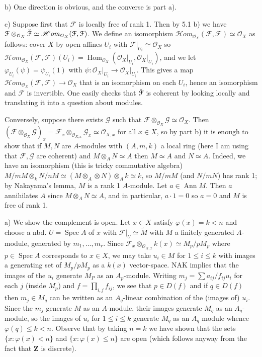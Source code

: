 \documentclass{report}
\newcommand{\F}{\mathcal{F}}
\renewcommand{\O}{\mathcal{O}}
\newcommand{\G}{\mathcal{G}}
\newcommand{\Z}{\mathbf{Z}}
\newcommand{\HOM}{\mathscr{H}\mathit{om}}
\DeclareMathOperator{\Hom}{Hom}
\DeclareMathOperator{\Spec}{Spec}
\DeclareMathOperator{\Ann}{Ann}
\begin{document}
\noindent
b)	One direction is obvious, and the converse is part a).

\noindent
c)	Suppose first that $\F$ is locally free of rank 1.  Then by 5.1 b) we have $\F\otimes_{\O_X}\Check{\F}\simeq \HOM_{\O_X}(\F,\F)$.
We define an isomorphism $\HOM_{\O_X}(\F,\F)\simeq \O_X$ as follows: cover $X$ by open affines $U_i$ with
$\F\big|_{U_i}\simeq \O_X$ so $\HOM_{\O_X}(\F,\F)(U_i)=\Hom_{\O_X}(\O_X\big|_{U_i},\O_X\big|_{U_i})$, and we let
$\varphi_{U_i}(\psi)=\psi_{U_i}(1)$ with $\psi:\O_X\big|_{U_i}\rightarrow \O_X\big|_{U_i}$.  This gives a map 
$\HOM_{\O_X}(\F,\F)\rightarrow \O_X$ that is an isomorphism on each $U_i$, hence an isomorphism and $\F$
is invertible.	One easily checks that $\Check{\F}$ is coherent by looking locally and translating
it into a question about modules.

Conversely, suppose there exists $\G$ such that $\F\otimes_{\O_X}\G\simeq \O_X$.  Then
$(\F\otimes_{\O_X}\G)_x=\F_x\otimes_{\O_{X,x}}\G_x\simeq \O_{X,x}$ for all $x\in X$, so 
by part b) it is enough to show that if $M,N$ are $A$-modules with $(A,m,k)$ a local ring (here I am using that $\F,\G$
are coherent)	and $M\otimes_A N\simeq A$ then $M\simeq A$ and $N\simeq A$.
Indeed, we have an isomorphism (this is tricky commutative algebra) $M/mM\otimes_k N/nM\simeq (M\otimes_A\otimes N)\otimes_A k\simeq k$,
so $M/mM$ (and $N/mN$) has rank 1; by Nakayama's lemma, $M$ is a rank 1 $A$-module.
Let $a\in \Ann M$.  Then $a$ annihilates $A$ since $M\otimes_A N\simeq A$,
and in particular, $a\cdot 1=0$ so $a=0$ and $M$ is free of rank 1.


\bigskip
{} a)	We show the complement is open.  Let $x\in X$ satisfy $\varphi(x)=k< n$ and choose a nbd. $U=\Spec A$ of  $x$
with $\F\big|_U\simeq \widetilde{M}$ with $M$ a finitely generated $A$-module, generated by $m_1,\ldots,m_r$.
Since $\F_x\otimes_{\O_{X,x}} k(x)\simeq M_p/pM_p$ where $p\in \Spec A$ corresponds to $x\in X$,
we may take $u_i\in M$ for $1\le i\le k$ with images a generating set of $M_p/pM_p$
as a $k(x)$ vector-space.  NAK implies that the images of the $u_i$ generate $M_P$ as an $A_p$-module.
Writing $m_j=\sum {a_{ij}/f_{ij}} u_i$ for each $j$ (inside $M_p$) and $f=\prod_{i,j} f_{ij}$, we see that $p\in D(f)$
and if $q\in D(f)$ then $m_j\in M_q$ can be written as an $A_q$-linear combination of the (images of) $u_i$.
Since the $m_j$ generate $M$ as an $A$-module, their images generate $M_q$ as an $A_q$-module,
so the images of $u_i$ for $1\le i\le k$ generate $M_q$ as an $A_q$ module whence $\varphi(q)\le k < n$.
Observe that by taking $n=k$ we have shown that the sets $\{x:\varphi(x)< n\}$ and $\{x:\varphi(x)\le n\}$
are open (which follows anyway from the fact that $\Z$ is discrete).
\end{document}
